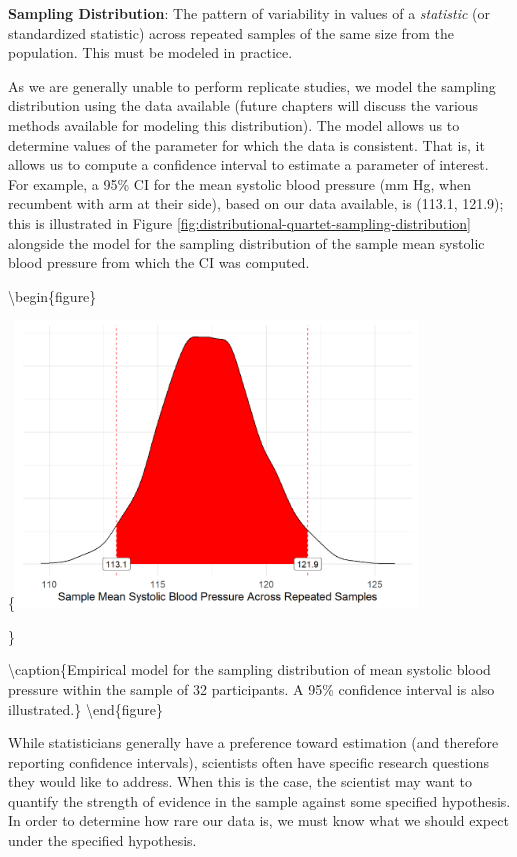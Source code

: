 \documentclass[
]{book}
\theoremstyle{plain}
\theoremstyle{mydefn}
\theoremstyle{myexmpl}
\theoremstyle{remark}
\begin{document}
\begin{rmdfivefund}
\textbf{Sampling Distribution}: The pattern of variability in values of a \emph{statistic} (or standardized statistic) across repeated samples of the same size from the population. This must be modeled in practice.
\end{rmdfivefund}

As we are generally unable to perform replicate studies, we model the sampling distribution using the data available (future chapters will discuss the various methods available for modeling this distribution). The model allows us to determine values of the parameter for which the data is consistent. That is, it allows us to compute a confidence interval to estimate a parameter of interest. For example, a 95\% CI for the mean systolic blood pressure (mm Hg, when recumbent with arm at their side), based on our data available, is (113.1, 121.9); this is illustrated in Figure \ref{fig:distributional-quartet-sampling-distribution} alongside the model for the sampling distribution of the sample mean systolic blood pressure from which the CI was computed.

\textbackslash begin\{figure\}

\{\centering \includegraphics[width=0.8\textwidth]{./Images/distributional-quartet-sampling-distribution-1}

\}

\textbackslash caption\{Empirical model for the sampling distribution of mean systolic blood pressure within the sample of 32 participants. A 95\% confidence interval is also illustrated.\}\label{fig:distributional-quartet-sampling-distribution}
\textbackslash end\{figure\}

While statisticians generally have a preference toward estimation (and therefore reporting confidence intervals), scientists often have specific research questions they would like to address. When this is the case, the scientist may want to quantify the strength of evidence in the sample against some specified hypothesis. In order to determine how rare our data is, we must know what we should expect under the specified hypothesis.
\end{document}
